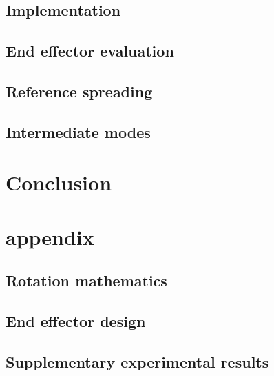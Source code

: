 \documentclass[a4paper, 10pt, conference]{ieeeconf}
\begin{document}
    \subsection{Implementation}
    \subsection{End effector evaluation}
    \subsection{Reference spreading}
    \subsection{Intermediate modes}

    \section{Conclusion}
    
\clearpage
\section*{appendix}
\subsection{Rotation mathematics}
\subsection{End effector design}
\subsection{Supplementary experimental results}
\end{document}
